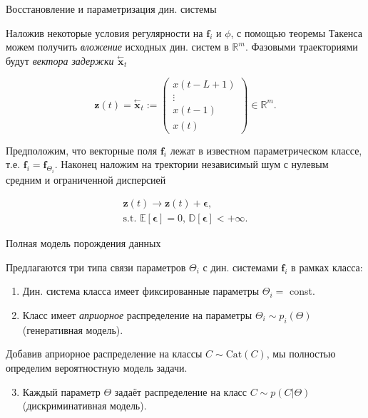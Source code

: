 \documentclass[10pt]{beamer}
\newcommand{\delayV}[1]{\overset{\leftarrow}{\textbf{x}}_{#1}}
\theoremstyle{definition}
\begin{document}
	\begin{frame}{Восстановление и параметризация дин. системы}
		
		Наложив некоторые условия регулярности на $\textbf{f}_i$ и $\phi$, с помощью теоремы Такенса можем получить \emph{вложение} исходных дин. систем в $\mathbb{R}^m$. Фазовыми траекториями будут \emph{вектора задержки} $\delayV{t}$
		
		\begin{equation*}
			\textbf{z}(t) = \delayV{t} := \begin{pmatrix}
				x(t - L + 1) \\
				\vdots \\
				x(t - 1) \\
				x(t)
			\end{pmatrix} \in \mathbb{R}^m.
		\end{equation*}
		
		Предположим, что векторные поля $\textbf{f}_i$ лежат в известном параметрическом классе, т.е. $\textbf{f}_i = \textbf{f}_{\Theta_i}$. Наконец наложим на тректории независимый шум с нулевым средним и ограниченной дисперсией
		
		\begin{gather*}
			\textbf{z}(t) \to \textbf{z}(t) + \boldsymbol{\epsilon}, \\
			\text{s.t. } \mathbb{E}[\boldsymbol{\epsilon}] = 0, \, \mathbb{D}[\boldsymbol{\epsilon}] < +\infty.
		\end{gather*}
		
	\end{frame}	
	
	\begin{frame}{Полная модель порождения данных}
		
		Предлагаются три типа связи параметров $\Theta_i$ с дин. системами $\textbf{f}_i$ в рамках класса:
		
		\begin{enumerate}
			\item Дин. система класса имеет фиксированные параметры $\Theta_i = $ const. 
			
			\item Класс имеет \emph{априорное} распределение на параметры $\Theta_i \sim p_i(\Theta)$ (генеративная модель).
		\end{enumerate}
		
		Добавив априорное распределение на классы $ C \sim \text{Cat}(C) $, мы полностью определим вероятностную модель задачи.
		
		\begin{enumerate}
			\setcounter{enumi}{2}
			\item Каждый параметр $\Theta$ задаёт распределение на класс $C \sim p(C | \Theta)$ (дискриминативная модель).
		\end{enumerate}
		
		\begin{figure}
			\centering
		\end{figure}
		
	\end{frame}
\end{document}
